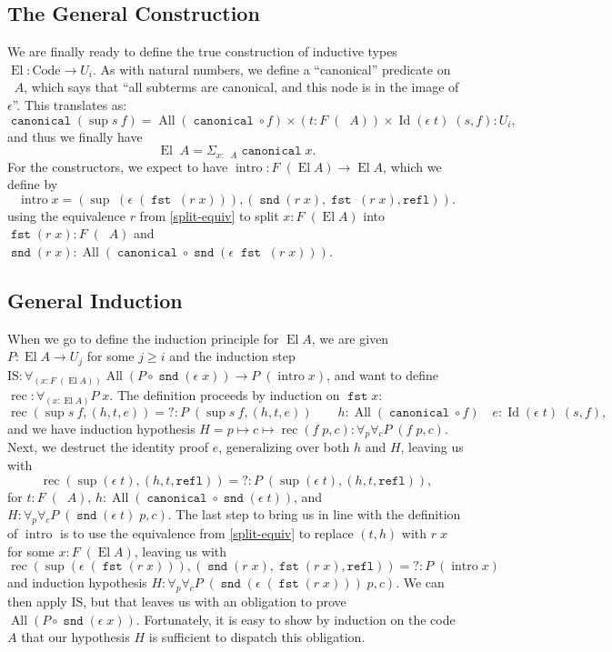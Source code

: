 \documentclass[a4paper,UKenglish,cleveref,nameinlink,autoref,thm-restate]{lipics-v2019}
\DeclareMathOperator{\supop}{sup}
\renewcommand{\sup}[2]{\supop {#1}\:\!{#2}}
\DeclareMathOperator{\Idop}{\mathrm{Id}}
\newcommand{\Id}[2]{\Idop {#1}\;{#2}}
\newcommand{\refl}{\mathtt{refl}}
\DeclareMathOperator{\fst}{\mathtt{fst}}
\DeclareMathOperator{\snd}{\mathtt{snd}}
\DeclareMathOperator{\canonical}{\hyperref[define-canonical]{\mathtt{canonical}}}
\newcommand{\IS}{\mathrm{IS}}
\newcommand{\Code}{\mathrm{Code}}
\DeclareMathOperator{\El}{El}
\DeclareMathOperator{\preEl}{\tilde{El}}
\DeclareMathOperator{\intro}{intro}
\DeclareMathOperator{\rec}{rec}
\DeclareMathOperator{\All}{All}
\newcommand{\splitequiv}{\hyperref[split-equiv]{r}}
\begin{document}
\subsection{The General Construction}
We are finally ready to define the true construction of inductive types $\El : \Code \to U_i$. As with natural numbers, we define a ``canonical'' predicate on $\preEl A$, which says that ``all subterms are canonical, and this node is in the image of $\epsilon$''.
This translates as:
\begin{equation}
\canonical (\sup{s}{f}) = \All (\canonical \circ f) \times (t : F\;(\preEl A)) \times \Id{(\epsilon\; t)}{(s, f)} : U_i,\end{equation}
and thus we finally have \begin{equation}\El\;A = \Sigma_{x : \preEl A} \canonical x.\end{equation}
For the constructors, we expect to have $\intro : F\;(\El A) \to \El A$, which we define by
\begin{equation}
\intro x = (\supop\;(\epsilon\;(\fst\;(\splitequiv\;x))),(\snd(\splitequiv\;x),\fst\;(\splitequiv\;x),\refl)).
\end{equation}
using the equivalence $\splitequiv$ from \cref{split-equiv} to split $x : F\;(\El A)$ into $\fst(\splitequiv\;x) : F\;(\preEl A)$ and $\snd(\splitequiv\;x) : \All(\canonical \circ \snd(\epsilon\;\fst\;(\splitequiv\;x)))$.

\subsection{General Induction}
When we go to define the induction principle for $\El A$, we are given $P : \El A \to U_j$ for some $j \geq i$ and the induction step $\IS : \forall_{(x : F\;(\El A))}\All(P \circ \snd(\epsilon\;x)) \to P\;(\intro x)$, and want to define $\rec : \forall_{(x : \El A)}P\;x$. The definition proceeds by induction on $\fst x$:
\[\rec(\sup{s}{f},(h,t,e)) ={} ? : P\;(\sup{s}{f},(h,t,e))\qquad h : \All(\canonical \circ f) \quad  e : \Id{(\epsilon \;t)}{(s,f)},\] and we have induction hypothesis $H = p \mapsto c \mapsto \rec(f\;p,c) : \forall_p\forall_c P\;(f\;p,c)$. Next, we destruct the identity proof $e$, generalizing over both $h$ and $H$, leaving us with
\[\rec(\supop(\epsilon\;t),(h,t,\refl)) ={} ? : P\;(\supop(\epsilon\;t),(h,t,\refl)),\] for $t : F\;(\preEl A)$, $h : \All(\canonical\circ\snd(\epsilon\;t))$, and $H : \forall_p\forall_cP\;(\snd(\epsilon\;t)\;p,c)$. The last step to bring us in line with the definition of $\intro$ is to use the equivalence from \cref{split-equiv} to replace $(t, h)$ with $\splitequiv\;x$ for some $x : F\;(\El A)$, leaving us with
\[\rec(\supop(\epsilon\;(\fst(\splitequiv\;x))),(\snd(\splitequiv\;x),\fst(\splitequiv\;x),\refl)) ={} ? : P\;(\intro x)\]
and induction hypothesis $H : \forall_p\forall_c P\;(\snd(\epsilon\;(\fst(\splitequiv\;x)))\;p,c)$. We can then apply $\IS$, but that leaves us with an obligation to prove $\All (P\circ\snd(\epsilon\;x))$. Fortunately, it is easy to show by induction on the code $A$ that our hypothesis $H$ is sufficient to dispatch this obligation.
\end{document}
